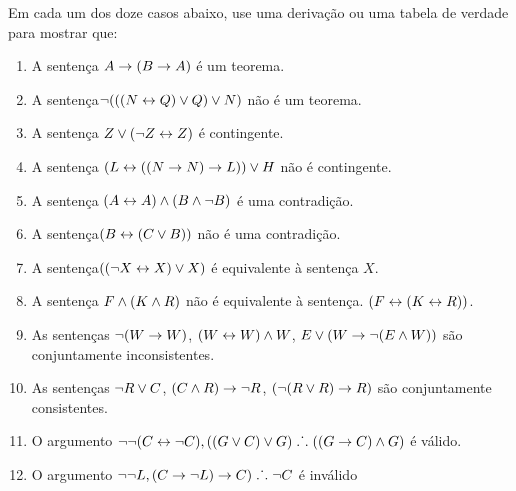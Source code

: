 \noindent\problempart Em cada um dos doze casos abaixo, use uma  deriva\c c\~ao ou uma tabela de verdade para mostrar que:
\begin{enumerate}%
\item A senten\c ca $A \rightarrow (B \rightarrow A)$ \'e um teorema.
\item A senten\c ca$\neg (((N \leftrightarrow Q) \vee Q) \vee N)$ n\~ao \'e um teorema.
\item A senten\c ca $ Z \vee (\neg Z \leftrightarrow Z) $ \'e contingente.
\item A senten\c ca $ (L \leftrightarrow ((N \rightarrow N) \rightarrow L)) \vee H $ n\~ao \'e contingente.
\item A senten\c ca $ (A \leftrightarrow A) \wedge (B \wedge \neg B)$ \'e uma contradi\c c\~ao.
\item A senten\c ca$ (B \leftrightarrow (C \vee B)) $ n\~ao \'e uma contradi\c c\~ao. 
\item A senten\c ca$ ((\neg X \leftrightarrow X) \vee X) $  \'e equivalente \`a senten\c ca $X$.
\item A senten\c ca $F \wedge (K \wedge R) $ n\~ao  \'e equivalente \`a senten\c ca. $ (F \leftrightarrow (K \leftrightarrow R)) $.
\item As senten\c cas $ \neg (W \rightarrow W)$, $(W \leftrightarrow W) \wedge W$, $E \vee (W \rightarrow \neg (E \wedge W))$ s\~ao conjuntamente inconsistentes. 

\item As senten\c cas  $\neg R \vee C $, $(C \wedge R) \rightarrow \neg R$, $(\neg (R \vee R) \rightarrow R) $ s\~ao conjuntamente consistentes.
\item O argumento $\neg \neg (C \leftrightarrow \neg C), ((G \vee C) \vee G) \mathrel{\ldotp\dot{}\,\ldotp} ((G \rightarrow C) \wedge G) $ \'e v\'alido.
\item O argumento $ \neg \neg L,  (C \rightarrow \neg L) \rightarrow C) \mathrel{\ldotp\dot{}\,\ldotp} \neg C$  \'e  inv\'alido
\end{enumerate}

